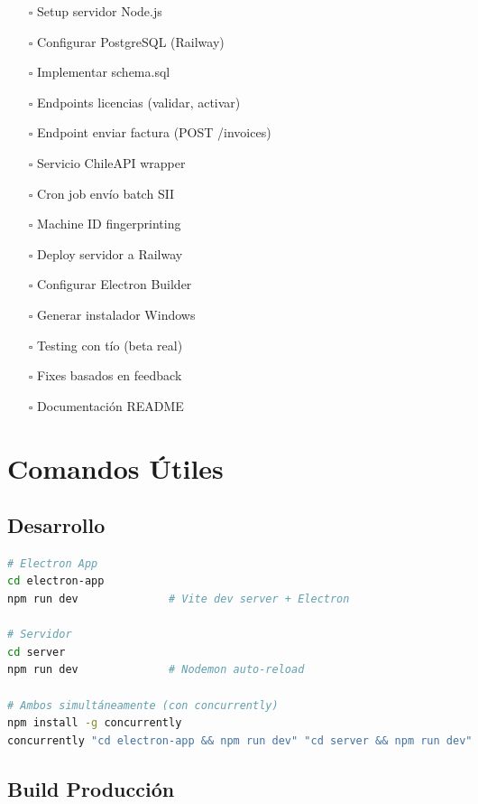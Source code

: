 \documentclass[11pt,a4paper]{article}
\begin{document}
\begin{itemize}
    \item[$\square$] Setup servidor Node.js
    \item[$\square$] Configurar PostgreSQL (Railway)
    \item[$\square$] Implementar schema.sql
    \item[$\square$] Endpoints licencias (validar, activar)
    \item[$\square$] Endpoint enviar factura (POST /invoices)
    \item[$\square$] Servicio ChileAPI wrapper
    \item[$\square$] Cron job envío batch SII
    \item[$\square$] Machine ID fingerprinting
    \item[$\square$] Deploy servidor a Railway
    \item[$\square$] Configurar Electron Builder
    \item[$\square$] Generar instalador Windows
    \item[$\square$] Testing con tío (beta real)
    \item[$\square$] Fixes basados en feedback
    \item[$\square$] Documentación README
\end{itemize}

\newpage

\section{Comandos Útiles}

\subsection{Desarrollo}

\begin{lstlisting}[language=bash]
# Electron App
cd electron-app
npm run dev              # Vite dev server + Electron

# Servidor
cd server
npm run dev              # Nodemon auto-reload

# Ambos simultáneamente (con concurrently)
npm install -g concurrently
concurrently "cd electron-app && npm run dev" "cd server && npm run dev"
\end{lstlisting}

\subsection{Build Producción}
\end{document}
